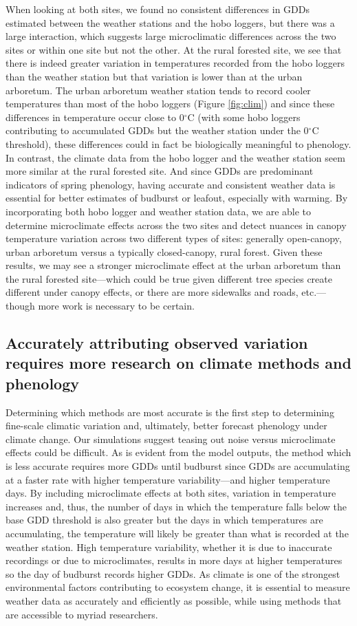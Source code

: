 \documentclass{article}\usepackage[]{graphicx}\usepackage[]{color}
\begin{document}
When looking at both sites, we found no consistent differences in GDDs estimated between the weather stations and the hobo loggers, but there was a large interaction, which suggests large microclimatic differences across the two sites or within one site but not the other. At the rural forested site, we see that there is indeed greater variation in temperatures recorded from the hobo loggers than the weather station but that variation is lower than at the urban arboretum. The urban arboretum weather station tends to record cooler temperatures than most of the hobo loggers (Figure \ref{fig:clim}) and since these differences in temperature occur close to 0$^{\circ}$C (with some hobo loggers contributing to accumulated GDDs but the weather station under the 0$^{\circ}$C threshold), these differences could in fact be biologically meaningful to phenology. In contrast, the climate data from the hobo logger and the weather station seem more similar at the rural forested site. And since GDDs are predominant indicators of spring phenology, having accurate and consistent weather data is essential for better estimates of budburst or leafout, especially with warming. By incorporating both hobo logger and weather station data, we are able to determine microclimate effects across the two sites and detect nuances in canopy temperature variation across two different types of sites: generally open-canopy, urban arboretum versus a typically closed-canopy, rural forest. Given these results, we may see a stronger microclimate effect at the urban arboretum than the rural forested site---which could be true given different tree species create different under canopy effects, or there are more sidewalks and roads, etc.---though more work is necessary to be certain.

\subsection*{Accurately attributing observed variation requires more research on climate methods and phenology} 
Determining which methods are most accurate is the first step to determining fine-scale climatic variation and, ultimately, better forecast phenology under climate change. Our simulations suggest teasing out noise versus microclimate effects could be difficult. As is evident from the model outputs, the method which is less accurate requires more GDDs until budburst since GDDs are accumulating at a faster rate with higher temperature variability---and higher temperature days. By including microclimate effects at both sites, variation in temperature increases and, thus, the number of days in which the temperature falls below the base GDD threshold is also greater but the days in which temperatures are accumulating, the temperature will likely be greater than what is recorded at the weather station. High temperature variability, whether it is due to inaccurate recordings or due to microclimates, results in more days at higher temperatures so the day of budburst records higher GDDs. As climate is one of the strongest environmental factors contributing to ecosystem change, it is essential to measure weather data as accurately and efficiently as possible, while using methods that are accessible to myriad researchers.
  
\end{document}
